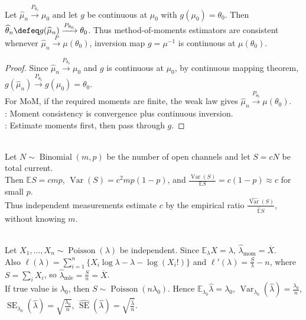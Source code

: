 \begin{proposition} \label{prop:method-of-moments-consistency} \\
Let $\widehat{\mu}_n\xrightarrow{P_{\theta_0}}\mu_0$ and let $g$ be continuous at $\mu_0$ with $g(\mu_0)=\theta_0$. Then $\widehat{\theta}_n\defeq g(\widehat{\mu}_n)\xrightarrow{P_{\theta_0}}\theta_0$. Thus method-of-moments estimators are consistent whenever $\widehat{\mu}_n\xrightarrow{P}\mu(\theta_0)$, inversion map $g=\mu^{-1}$ is continuous at $\mu(\theta_0)$.
\begin{proof} Since $\widehat{\mu}_n\xrightarrow{P_{\theta_0}}\mu_0$ and $g$ is continuous at $\mu_0$, by continuous mapping theorem, $g(\widehat{\mu}_n)\xrightarrow{P_{\theta_0}}g(\mu_0)=\theta_0$.\\
For MoM, if the required moments are finite, the weak law gives $\widehat{\mu}_n\xrightarrow{P_{\theta_0}}\mu(\theta_0)$.\\
: Moment consistency is convergence plus continuous inversion.\\
: Estimate moments first, then pass through $g$.
\end{proof}
\end{proposition}

\begin{example} \label{ex:ion-channel-current-moment-estimation} \\
Let $N\sim\operatorname{Binomial}(m,p)$ be the number of open channels and let $S=cN$ be total current.\\
Then $\mathbb{E}S=cmp$, $\operatorname{Var}(S)=c^2mp(1-p)$, and $\frac{\operatorname{Var}(S)}{\mathbb{E}S}=c(1-p)\approx c$ for small $p$.\\
Thus independent measurements estimate $c$ by the empirical ratio $\frac{\widehat{\operatorname{Var}}(S)}{\widehat{\mathbb{E}}S}$, without knowing $m$.
\end{example}

\begin{example} \label{ex:poisson-moments-likelihood-standard-error} \\
Let $X_1,\ldots,X_n\sim\operatorname{Poisson}(\lambda)$ be independent. Since $\mathbb{E}_\lambda X=\lambda$, $\widehat{\lambda}_{\mathrm{mom}}=\overline{X}$.\\
Also $\ell(\lambda)=\sum\limits_{i=1}^{n}\{X_i\log\lambda-\lambda-\log(X_i!)\}$ and $\ell'(\lambda)=\frac{S}{\lambda}-n$, where $S=\sum\limits_iX_i$, so $\widehat{\lambda}_{\mathrm{mle}}=\frac{S}{n}=\overline{X}$.\\
If true value is $\lambda_0$, then $S\sim\operatorname{Poisson}(n\lambda_0)$. Hence $\mathbb{E}_{\lambda_0}\widehat{\lambda}=\lambda_0$, $\operatorname{Var}_{\lambda_0}(\widehat{\lambda})=\frac{\lambda_0}{n}$, $\operatorname{SE}_{\lambda_0}(\widehat{\lambda})=\sqrt{\frac{\lambda_0}{n}}$, $\widehat{\operatorname{SE}}(\widehat{\lambda})=\sqrt{\frac{\widehat{\lambda}}{n}}$.
\end{example}

